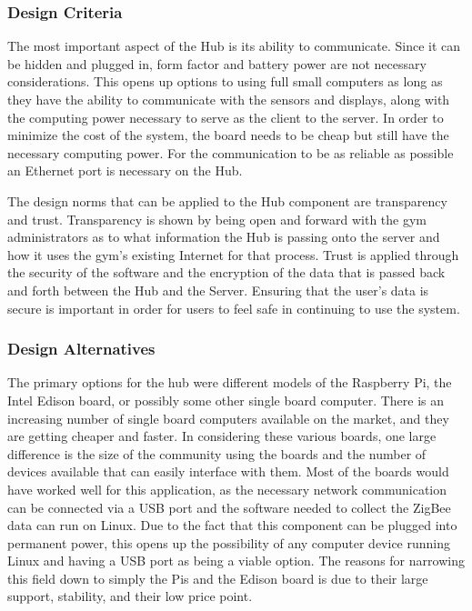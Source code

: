 \documentclass[PPFS.tex]{template/subfiles}
\begin{document}
\subsubsection{Design Criteria}
The most important aspect of the Hub is its ability to communicate. Since it can be hidden and plugged in, form factor and battery power are not necessary considerations. This opens up options to using full small computers as long as they have the ability to communicate with the sensors and displays, along with the computing power necessary to serve as the client to the server. In order to minimize the cost of the system, the board needs to be cheap but still have the necessary computing power. For the communication to be as reliable as possible an Ethernet port is necessary on the Hub.

The design norms that can be applied to the Hub component are transparency and trust. Transparency is shown by being open and forward with the gym administrators as to what information the Hub is passing onto the server and how it uses the gym's existing Internet for that process. Trust is applied through the security of the software and the encryption of the data that is passed back and forth between the Hub and the Server. Ensuring that the user's data is secure is important in order for users to feel safe in continuing to use the system.

\subsubsection{Design Alternatives}
The primary options for the hub were different models of the Raspberry Pi, the Intel Edison board, or possibly some other single board computer. There is an increasing number of single board computers available on the market, and they are getting cheaper and faster. In considering these various boards, one large difference is the size of the community using the boards and the number of devices available that can easily interface with them. Most of the boards would have worked well for this application, as the necessary network communication can be connected via a USB port and the software needed to collect the ZigBee data can run on Linux. Due to the fact that this component can be plugged into permanent power, this opens up the possibility of any computer device running Linux and having a USB port as being a viable option. The reasons for narrowing this field down to simply the Pis and the Edison board is due to their large support, stability, and their low price point.
\end{document}
